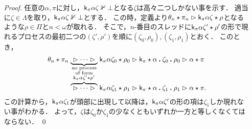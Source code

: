 \documentclass[realisability.tex]{subfiles}
\begin{document}
\begin{proof}
 任意の$\alpha, \pi$に対し，$\mathsf{k}_\pi \alpha \zeta \nVdash \bot$となる$\zeta$は高々二つしかない事を示す．
 適当に$\zeta \in \Lambda$を取り，$\mathsf{k}_\pi \alpha \zeta \nVdash \bot$とする．
 この時，定義より$\theta_n \mathbin{\star} \pi_n \mathrel{\rhd} \mathsf{k}_\pi \alpha \zeta \mathbin{\star} \rho$となるような$\rho \in \Pi$と$n < \omega$が取れる．
 そこで，$n$-番目のスレッドに$\mathsf{k}_\pi \alpha \zeta' \mathbin{\star} \rho'$の形で現れるプロセスの最初二つの$(\zeta', \rho')$を順に$(\zeta_0, \rho_0), (\zeta_1, \rho_1)$とおく．
 このとき，
\begin{align*}
 \theta_n \cons \pi_n
 &\mathrel{\underbrace{\ \reds \cdots \reds\ }_{\substack{\text{no process}\\\text{of form}\\\conti_\pi \alpha \zeta' \cons \rho'}}}
 \conti_\pi \alpha \zeta_0 \cons \rho_0
 \reds
 \KVM{{{\conti_\pi}} \alpha {{\zeta_0}} {{\rho_0}}}
 \reds
 \alpha \cons \pi\\[-.25em]
 &\mathrel{\overbrace{\ \reds \cdots \reds\ }}
 \conti_\pi \alpha \zeta_1 \cons \rho_1
 \reds \KVM{{{\conti_\pi}} \alpha {{\zeta_1}} {{\rho_1}}}
 \reds
 \alpha \cons \pi.
\end{align*}
 この計算から，$\mathsf{k}_\pi \alpha \zeta_1$が頭部に出現して以降は，$\mathsf{k}_\pi \alpha \zeta'$の形の項は$\zeta_1$しか現れない事がわかる．
 よって，$\zeta$は$\zeta_0$か$\zeta_1$の少なくともいずれか一方と等しくなくてはならない． \qed
\end{proof}
\end{document}
